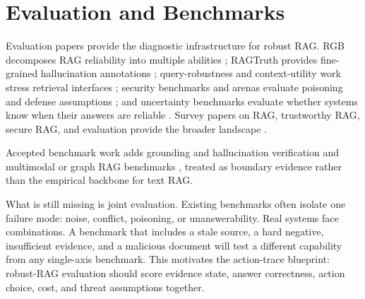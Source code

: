 \section{Evaluation and Benchmarks}

Evaluation papers provide the diagnostic infrastructure for robust RAG. RGB decomposes RAG reliability into multiple abilities \citep{rgb2023}; RAGTruth provides fine-grained hallucination annotations \citep{ragTruth2024}; query-robustness and context-utility work stress retrieval interfaces \citep{queryRobustness2025,rrag058}; security benchmarks and arenas evaluate poisoning and defense assumptions \citep{rrag019,rrag023,rrag035}; and uncertainty benchmarks evaluate whether systems know when their answers are reliable \citep{rrag001,rrag093}. Survey papers on RAG, trustworthy RAG, secure RAG, and evaluation provide the broader landscape \citep{ragSurvey2024,ragComprehensive2025,ragEvaluationSurvey2024,trustRAGCompass2024,trustworthyRAGSurvey2025,securityRAGSurvey2026,rrag134,rrag151}.

Accepted benchmark work adds grounding and hallucination verification \citep{venueAcc015,venueAcc020,venueAcc026} and multimodal or graph RAG benchmarks \citep{venueAcc002,venueAcc004,venueAcc006,venueAcc019}, treated as boundary evidence rather than the empirical backbone for text RAG.

What is still missing is joint evaluation. Existing benchmarks often isolate one failure mode: noise, conflict, poisoning, or unanswerability. Real systems face combinations. A benchmark that includes a stale source, a hard negative, insufficient evidence, and a malicious document will test a different capability from any single-axis benchmark. This motivates the action-trace blueprint: robust-RAG evaluation should score evidence state, answer correctness, action choice, cost, and threat assumptions together.

